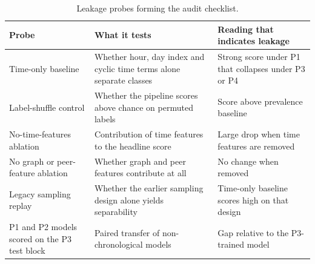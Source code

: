 \begin{table}[t]
\centering\small
\caption{Leakage probes forming the audit checklist.}
\begin{tabular}{lp{3.2cm}p{3.2cm}}
\toprule
Probe & What it tests & Reading that indicates leakage \\
\midrule
Time-only baseline & Whether hour, day index and cyclic time terms alone separate classes & Strong score under P1 that collapses under P3 or P4 \\
Label-shuffle control & Whether the pipeline scores above chance on permuted labels & Score above prevalence baseline \\
No-time-features ablation & Contribution of time features to the headline score & Large drop when time features are removed \\
No graph or peer-feature ablation & Whether graph and peer features contribute at all & No change when removed \\
Legacy sampling replay & Whether the earlier sampling design alone yields separability & Time-only baseline scores high on that design \\
P1 and P2 models scored on the P3 test block & Paired transfer of non-chronological models & Gap relative to the P3-trained model \\
\bottomrule
\end{tabular}
\label{tab:leakage_probes}
\end{table}
